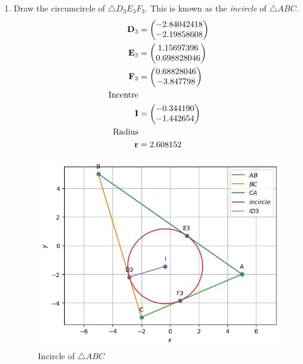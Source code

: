 \documentclass[11pt]{book}
\begin{document}
\begin{enumerate}[label=\thesection.\arabic*.,ref=\thesection.\theenumi]
\item Draw the circumcircle of $\triangle D_3E_3F_3$.  This is known as the {\em incircle} of $\triangle ABC$. \\
\solution 
\begin{align}
    \mathbf{D}_3 &= \begin{pmatrix}-2.84042418\\ -2.19858608\end{pmatrix} \\
    \mathbf{E}_3 &= \begin{pmatrix}1.15697396  \\ 0.698828046\end{pmatrix} \\
    \mathbf{F}_3 &= \begin{pmatrix}0.68828046  \\ -3.847798\end{pmatrix} \\
\text{Incentre}\\ 
    \mathbf{I} &= \begin{pmatrix} -0.344190 \\ -1.442654\end{pmatrix}\\
\text{Radius}\\
 \mathbf{r} &= 2.608152
\end{align}
\begin{figure}[H]
\includegraphics[width=\columnwidth]{figs/3000.jpg}
\caption{Incircle of $\triangle ABC$}
\label{fig:fig3}
\end{figure}
  

\end{enumerate}
\end{document}
